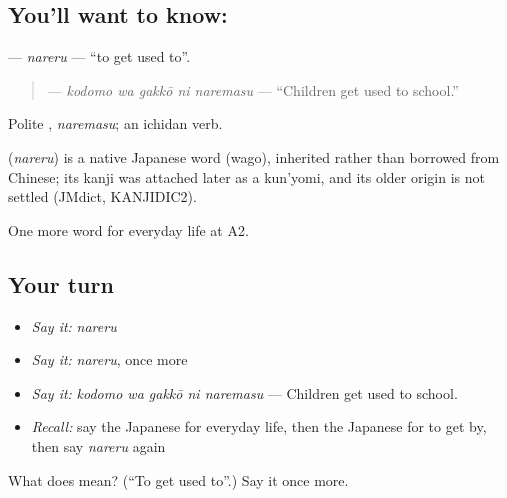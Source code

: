 \subsection*{You'll want to know: }
\textbf{} — \emph{nareru} — \textquotedblleft{}to get used to\textquotedblright{}.

\begin{quote}
\textbf{  } — \emph{kodomo wa gakkō ni naremasu} — \textquotedblleft{}Children get used to school.\textquotedblright{}
\end{quote}

Polite \textbf{}, \emph{naremasu}; an ichidan verb.

\begin{cousinweb}
\textbf{} (\emph{nareru}) is a native Japanese word (wago), inherited rather than borrowed from Chinese; its kanji was attached later as a kun'yomi, and its older origin is not settled (JMdict, KANJIDIC2).
\end{cousinweb}

\begin{grammarlens}[title={What you've built}]
One more word for everyday life at A2.
\end{grammarlens}

\subsection*{Your turn}
\begin{itemize}
\raggedright
  \item \emph{Say it:} \emph{nareru}
  \item \emph{Say it:} \emph{nareru}, once more
  \item \emph{Say it:} \emph{kodomo wa gakkō ni naremasu} — Children get used to school.
  \item \emph{Recall:} say the Japanese for everyday life, then the Japanese for to get by, then say \emph{nareru} again
\end{itemize}

\begin{tcolorbox}[breakable,colback=teal!4,colframe=teal!35!black,title={Before you move on}]
What does  mean? (\textquotedblleft{}To get used to\textquotedblright{}.) Say it once more.
\end{tcolorbox}
